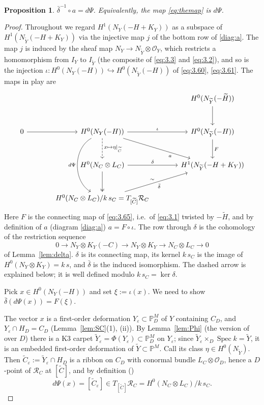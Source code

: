 \documentclass[11pt,twoside]{amsart}
\theoremstyle{plain}
\newtheorem{proposition}[theorem]{Proposition}
\theoremstyle{definition}
\newcommand{\PM}{\mathbb{P}^M}
\newcommand{\OO}{\mathcal{O}}
\newcommand{\Yt}{\widetilde{Y}}
\newcommand{\Ht}{\widetilde{H}}
\newcommand{\Ct}{\widetilde{C}}
\newcommand{\NY}{N_{Y}}
\newcommand{\NYt}{N_{\Yt}}
\newcommand{\RC}{\mathcal{R}_C}
\newcommand{\Dd}{D}
\begin{document}
\begin{proposition}\label{prop:a=dPsi}
$\bar\delta^{-1} \circ a= d\Psi$. Equivalently, the map \eqref{eq:themap} is $d\Psi$.
\end{proposition}

\begin{proof}
Throughout we regard $H^1(\NY(-H+K_Y))$ as a subspace of $H^1(\NYt(-H+K_Y))$ via the injective map $j$ of the bottom row of \eqref{diag:a}. The map $j$ is induced by the sheaf map $\NY\to\NYt\otimes\OO_Y$, which restricts a homomorphism from $I_Y$ to $I_{\Yt}$ (the composite of \eqref{eq:3.3} and \eqref{eq:3.2}), and so is the injection $\iota\colon H^0(\NY(-H))\hookrightarrow H^0(\NYt(-H))$ of \eqref{eq:3.60}, \eqref{eq:3.61}. The maps in play are
\begin{equation}\label{diag:overview}
\begin{tikzcd}[column sep=large, row sep=large]
&& H^0(\NYt(-\Ht))\arrow[d]\\
0\arrow[r] & H^0(\NY(-H))\arrow[r,"\iota"]\arrow[d,dashed,"x\mapsto\eta|_{\Ct}"]\arrow[dr,"a"' near end]\arrow[dd,bend right=60,"d\Psi"'] & H^0(\NYt(-H))\arrow[d,"F"]\\
& H^0(N_C\otimes L_C)\arrow[r,"\delta"]\arrow[d,two heads] & H^1(\NYt(-H+K_Y))\\
& H^0(N_C\otimes L_C)/k\,s_C=T_{[\Ct]}\RC\arrow[ur,"\bar\delta"',"\sim"] &
\end{tikzcd}
\end{equation}
Here $F$ is the connecting map of \eqref{eq:3.65}, i.e.\ of \eqref{eq:3.1} twisted by $-\Ht$, and by definition of $a$ (diagram \eqref{diag:a}) $a=F\circ\iota$. The row through $\delta$ is the cohomology of the restriction sequence $$0\to\NY\otimes K_Y(-C)\to\NY\otimes K_Y\to N_C\otimes L_C\to0$$ of Lemma~\ref{lem:delta}. $\delta$ is its connecting map, its kernel $k\,s_C$ is the image of $H^0(\NY\otimes K_Y)=k\,s$, and $\bar\delta$ is the induced isomorphism. The dashed arrow is explained below; it is well defined modulo $k\,s_C=\ker\delta$.

Pick $x\in H^0(\NY(-H))$ and set $\xi:=\iota(x)$. We need to show $\bar\delta(d\Psi(x))=F(\xi)$.

The vector $x$ is a first-order deformation $Y_\varepsilon\subset\PM_\Dd$ of $Y$ containing $C_\Dd$, and $Y_\varepsilon\cap H_\Dd=C_\Dd$ (Lemma~\ref{lem:SC}(1), (ii)). By Lemma~\ref{lem:Phi} (the version of \cite[Prop.~3.7]{GP97} over $\Dd$) there is a K3 carpet $\Yt_\varepsilon=\Phi(Y_\varepsilon)\subset\PM_\Dd$ on $Y_\varepsilon$; since $\Yt_\varepsilon\times_\Dd\operatorname{Spec}k=\Yt$, it is an embedded first-order deformation of $\Yt\subset\PM$. Call its class $\eta\in H^0(\NYt)$. Then $\Ct_\varepsilon:=\Yt_\varepsilon\cap H_\Dd$ is a ribbon on $C_\Dd$ with conormal bundle $L_C\otimes\OO_\Dd$, hence a $\Dd$-point of $\RC$ at $[\Ct]$, and by definition ()
\[
d\Psi(x)=[\Ct_\varepsilon]\in T_{[\Ct]}\RC=H^0(N_C\otimes L_C)/k\,s_C .
\]


\end{proof}
\end{document}
